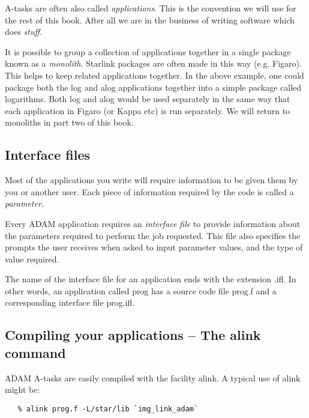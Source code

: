        A-tasks are often also called {\it applications}. This is the
       convention we will use for the rest of this book. After all
       we are in the business of writing software which 
       does {\em stuff}.

       It is possible to group a collection of applications together in a 
       single package known as a {\it monolith}. Starlink packages
       are often made in this way (e.g. Figaro). This helps to keep related 
       applications together. In the above example, one could package
       both the {\sf log} and {\sf alog} applications together 
       into a simple package called {\sf logarithms}. Both {\sf log} and
       {\sf alog} would be used separately in the same way that each
       application in {\sf Figaro} (or {\sf Kappa} etc) is run 
       separately. We will return to monoliths in part two of this book.

\subsection{Interface files}

       Most of the applications you write will require information to
       be given them by you or another user. Each piece of information
       required by the code is called a {\it parameter}.

       Every ADAM application requires an {\it interface file} to provide 
       information about the parameters required to 
       perform the job requested. This file also specifies the
       prompts the user receives when asked to input parameter values,
       and the type of value required.

       The name of the interface file for an application ends with the
       extension {\sf .ifl}. In other words, an application called {\sf prog}
       has a source code file {\sf prog.f} and a corresponding interface file
       {\sf prog.ifl}.

\subsection{Compiling your applications -- The alink command}

ADAM A-tasks are easily compiled with the facility {\sf alink}.
A typical use of {\sf alink} might be:

\begin{verbatim}
   % alink prog.f -L/star/lib `img_link_adam`
\end{verbatim}

